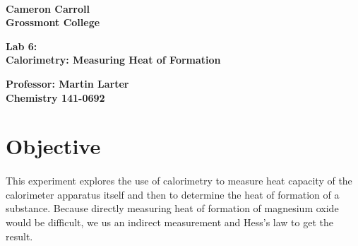 \documentclass[fleqn,titlepage]{article}
\begin{document}
\begin{titlepage}
  \mbox{}\\[1.25cm]
  \textbf{\LARGE Cameron Carroll \\ Grossmont College}\\[2.25cm]
  \begin{center}
    \textbf{\huge Lab 6: \\ Calorimetry: Measuring Heat of Formation}\\[2.50cm]
  \end{center}
  \textbf{\LARGE Professor: Martin Larter \\ Chemistry 141-0692} \\
  \vfill
\end{titlepage}

\section*{Objective}
  \paragraph{} This experiment explores the use of calorimetry to measure heat capacity of the calorimeter apparatus itself and then to determine the heat of formation of a substance. Because directly measuring heat of formation of magnesium oxide would be difficult, we us an indirect measurement and Hess's law to get the result.
\end{document}
